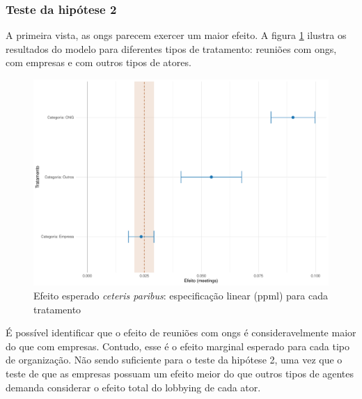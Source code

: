 \subsubsection{Teste da hipótese 2}

A primeira vista, as \acrshort{ong}s parecem exercer um maior efeito. A figura \ref{fig:effect_linear_ppml_treatments} ilustra os resultados do modelo para diferentes tipos de tratamento: reuniões com \acrshort{ong}s, com empresas e com outros tipos de atores. 


\begin{figure}[htbp]
    \centering
    \includegraphics[width=\textwidth]{figures/h2_test/fig_coeff_treatments_overall.pdf}
    \caption{Efeito esperado \textit{ceteris paribus}: especificação linear (\acrshort{ppml}) para cada tratamento}
    \label{fig:effect_linear_ppml_treatments}
\end{figure}

É possível identificar que o efeito de reuniões com \acrshort{ong}s é consideravelmente maior do que com empresas. Contudo, esse é o efeito marginal esperado para cada tipo de organização. Não sendo suficiente para o teste da hipótese 2, uma vez que o teste de que as empresas possuam um efeito meior do que outros tipos de agentes demanda considerar o efeito total do lobbying de cada ator.

